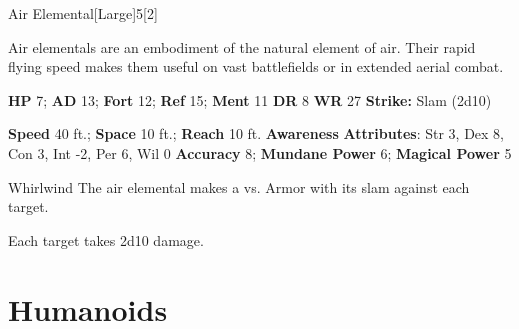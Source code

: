   \begin{monsection}{Air Elemental}[Large]{5}[2]
    \vspace{-1em}\vspace{-1em}
    \vspace{0em}

    
    Air elementals are an embodiment of the natural element of air.
    Their rapid flying speed makes them useful on vast battlefields or in extended aerial combat.
  

    \begin{spellcontent}
      \begin{spelltargetinginfo}
        \pari \textbf{HP} 7;
          \textbf{AD} 13;
          \textbf{Fort} 12;
          \textbf{Ref} 15;
          \textbf{Ment} 11
        \pari \textbf{DR} 8
        \pari \textbf{WR} 27
        \pari \textbf{Strike:}
            Slam  (2d10)
      \end{spelltargetinginfo}
    \end{spellcontent}
    \begin{monsterfooter}
      \pari \textbf{Speed} 40 ft.;
        \textbf{Space} 10 ft.;
        \textbf{Reach} 10 ft.
      \pari \textbf{Awareness} 
      \pari \textbf{Attributes}:
        Str 3, Dex 8,
        Con 3, Int -2,
        Per 6, Wil 0
      \pari \textbf{Accuracy} 8;
        \textbf{Mundane Power} 6;
      \textbf{Magical Power} 5
    \end{monsterfooter}
  \end{monsection}
  \begin{freeability}{Whirlwind}
       The air elemental makes a 
         vs. Armor
        with its slam against each target.
    
    \hit Each target takes 2d10  damage.
    \end{freeability}
  
        \section{Humanoids}
      
